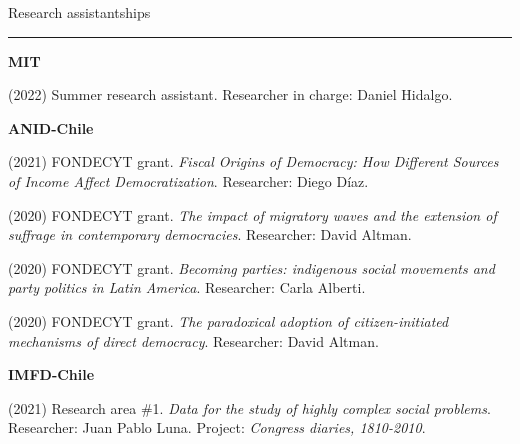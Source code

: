 \documentclass[a4paper, 12pt]{article}
\begin{document}
\large Research assistantships

\smallskip

\hrule

\normalsize

\begin{multicols}{2}

\textbf{MIT}

\columnbreak

\begin{flushright}

(2022) Summer research assistant. Researcher in charge: Daniel Hidalgo.

\end{flushright}

\end{multicols}

\begin{multicols}{2}

\textbf{ANID-Chile}

\columnbreak

\begin{flushright}

(2021) FONDECYT grant. \textit{Fiscal Origins of Democracy: How Different Sources of Income Affect Democratization}. Researcher: Diego Díaz.

(2020) FONDECYT grant. \textit{The impact of migratory waves and the extension of suffrage in contemporary democracies}. Researcher: David Altman.

(2020) FONDECYT grant. \textit{Becoming parties: indigenous social movements and party politics in Latin America}. Researcher: Carla Alberti. 

(2020) FONDECYT grant. \textit{The paradoxical adoption of citizen-initiated mechanisms of direct democracy}. Researcher: David Altman.

\end{flushright}

\end{multicols}

\begin{multicols}{2}

\textbf{IMFD-Chile}

\columnbreak

\begin{flushright}

(2021) Research area \#1. \textit{Data for the study of highly complex social problems}. Researcher: Juan Pablo Luna. Project: \textit{Congress diaries, 1810-2010}.

\end{flushright}

\end{multicols}
\end{document}
